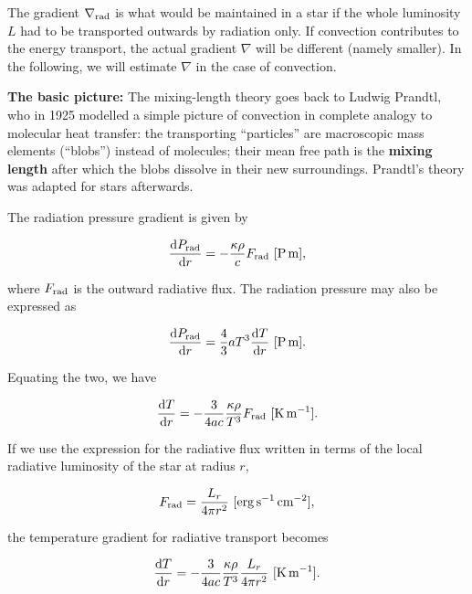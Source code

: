 \documentclass[a4paper,10pt]{article}
\begin{document}
{\noindent}The gradient $\nabla_{\rm rad}$ is what would be maintained in a star if the whole luminosity $L$ had to be transported outwards by radiation only. If convection contributes to the energy transport, the actual gradient $\nabla$ will be different (namely smaller). In the following, we will estimate $\nabla$ in the case of convection.

{\noindent}\textbf{The basic picture:} The mixing-length theory goes back to Ludwig Prandtl, who in 1925 modelled a simple picture of convection in complete analogy to molecular heat transfer: the transporting ``particles'' are macroscopic mass elements (``blobs'') instead of molecules; their mean free path is the \textbf{mixing length} after which the blobs dissolve in their new surroundings. Prandtl's theory was adapted for stars afterwards.

The radiation pressure gradient is given by 

\begin{align*}
    \frac{{\rm d}P_{\rm rad}}{{\rm d}r} = -\frac{\kappa\rho}{c}F_{\rm rad} ~ [{\rm P\,m}],
\end{align*}

{\noindent}where $F_{\rm rad}$ is the outward radiative flux. The radiation pressure may also be expressed as

\begin{align*}
    \frac{{\rm d}P_{\rm rad}}{{\rm d}r} = \frac{4}{3} aT^3 \frac{{\rm d}T}{{\rm d}r} ~ [{\rm P\,m}].
\end{align*}

{\noindent}Equating the two, we have

\begin{align*}
    \frac{{\rm d}T}{{\rm d}r} = -\frac{3}{4ac}\frac{\kappa\rho}{T^3}F_{\rm rad} ~ [{\rm K\,m^{-1}}].
\end{align*}

{\noindent}If we use the expression for the radiative flux written in terms of the local radiative luminosity of the star at radius $r$, 

\begin{align*}
    F_{\rm rad} = \frac{L_r}{4\pi r^2} ~ [{\rm erg\,s^{-1}\,cm^{-2}}],
\end{align*}

{\noindent}the temperature gradient for radiative transport becomes

\begin{align*}
    \frac{{\rm d}T}{{\rm d}r} = -\frac{3}{4ac}\frac{\kappa\rho}{T^3}\frac{L_r}{4\pi r^2} ~ [{\rm K\,m^{-1}}].
\end{align*}
\end{document}

